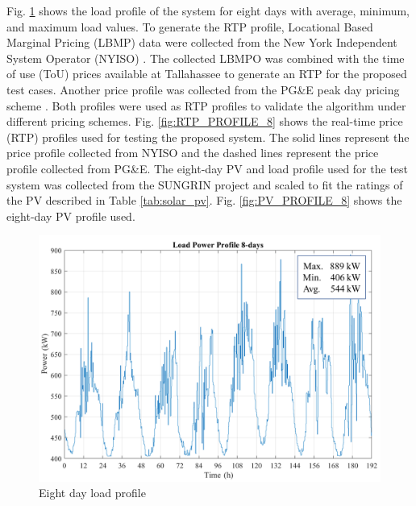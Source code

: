 Fig. \ref{fig:LOAD_PROFILE_8} shows the load profile of the system for eight days with average, minimum, and maximum load values. To generate the RTP profile, Locational Based Marginal Pricing (LBMP) data were collected from the New York Independent System Operator (NYISO) \cite{NYISO2017}. The collected LBMPO was combined with the time of use (ToU) prices available at Tallahassee to generate an RTP for the proposed test cases. Another price profile was collected from the PG\&E peak day pricing scheme \cite{pgne}. Both profiles were used as RTP profiles to validate the algorithm under different pricing schemes. Fig. \ref{fig:RTP_PROFILE_8} shows the real-time price (RTP) profiles used for testing the proposed system. The solid lines represent the price profile collected from NYISO and the dashed lines represent the price profile collected from PG\&E. The eight-day PV and load profile used for the test system was collected from the SUNGRIN project and scaled to fit the ratings of the PV described in Table \ref{tab:solar_pv}. Fig. \ref{fig:PV_PROFILE_8} shows the eight-day PV profile used.

\begin{figure}[!ht]
    \centering
    \includegraphics[width = \linewidth]{figs/A8/loadprofile.png}
    \caption{Eight day load profile}
    \label{fig:LOAD_PROFILE_8}
\end{figure}

